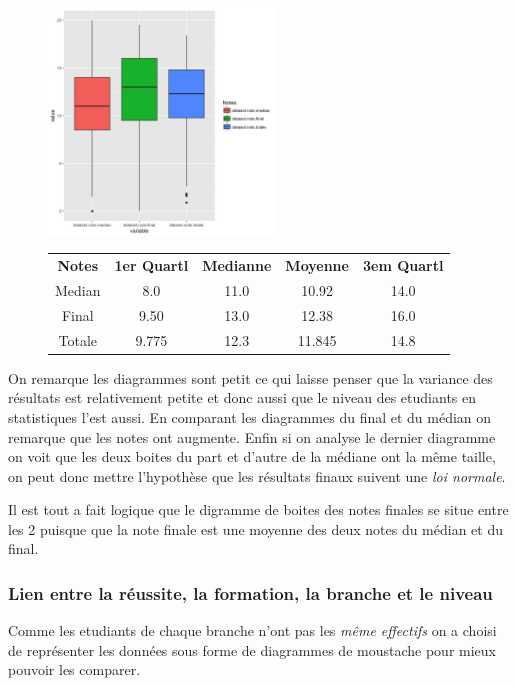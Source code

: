 \documentclass[]{report}
\begin{document}
\begin{figure}[h!]
	\begin{minipage}{.4\textwidth}		
		\includegraphics[width=60mm]{Figures/Notes/boxplot_exam.jpg}
		\label{fig:Boxplot_notes}
	\end{minipage}%
	\hspace{0.08\linewidth}
	\begin{minipage}{.6\textwidth}
		\begin{tabular}{c c c c c }
		\textbf{Notes} & \textbf{1er Quartl} & \textbf{Medianne}   & \textbf{Moyenne} & \textbf{3em Quartl} \\
		Median  & 8.0 			& 11.0		 & 10.92      & 14.0\\
		Final      & 9.50 		  & 13.0 	   & 12.38	    & 16.0\\
		Totale   & 9.775        & 12.3       &  11.845    & 14.8\\
	\end{tabular}
	\end{minipage}
\end{figure}


On remarque les diagrammes sont petit ce qui laisse penser que la variance des résultats est relativement petite et donc aussi que le niveau des etudiants en statistiques l'est aussi.  En comparant les diagrammes du final et du médian on remarque que les notes ont augmente.  Enfin si on analyse le dernier diagramme on voit que les deux boites du part et d'autre de la médiane ont la même taille, on peut donc mettre l'hypothèse que les résultats finaux suivent une \textit{loi normale}.

Il est tout a fait logique que le digramme de boites des notes finales se situe entre les 2 puisque que la note finale est une moyenne des deux notes du médian et du final.
 
	
\subsubsection{Lien entre la réussite, la formation, la branche et le niveau}
Comme les etudiants de chaque branche n'ont pas les \textit{même effectifs} on a choisi de représenter les données sous forme de diagrammes de moustache pour mieux pouvoir les comparer.
\end{document}
